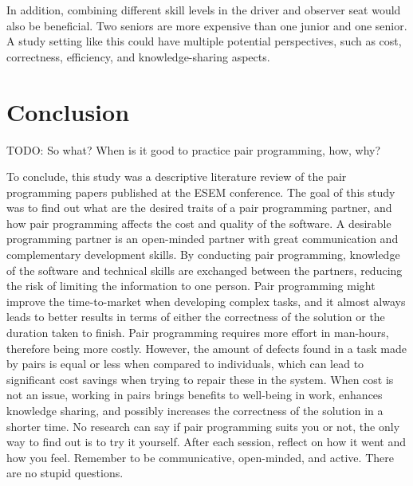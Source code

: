 \documentclass[conference]{IEEEtran}
\newcommand{\todo}[1]{{\color{red} TODO: {#1}}}
\begin{document}
In addition, combining different skill levels in the driver and observer seat would also be beneficial. Two seniors are more expensive than one junior and one senior. A study setting like this could have multiple potential perspectives, such as cost, correctness, efficiency, and knowledge-sharing aspects.

\section{Conclusion}

\todo{So what? When is it good to practice pair programming, how, why?}

To conclude, this study was a descriptive literature review of the pair programming papers published at the ESEM conference. The goal of this study was to find out what are the desired traits of a pair programming partner, and how pair programming affects the cost and quality of the software. A desirable programming partner is an open-minded partner with great communication and complementary development skills. By conducting pair programming, knowledge of the software and technical skills are exchanged between the partners, reducing the risk of limiting the information to one person. Pair programming might improve the time-to-market when developing complex tasks, and it almost always leads to better results in terms of either the correctness of the solution or the duration taken to finish. Pair programming requires more effort in man-hours, therefore being more costly. However, the amount of defects found in a task made by pairs is equal or less when compared to individuals, which can lead to significant cost savings when trying to repair these in the system. When cost is not an issue, working in pairs brings benefits to well-being in work, enhances knowledge sharing, and possibly increases the correctness of the solution in a shorter time. No research can say if pair programming suits you or not, the only way to find out is to try it yourself. After each session, reflect on how it went and how you feel. Remember to be communicative, open-minded, and active. There are no stupid questions.





\end{document}
